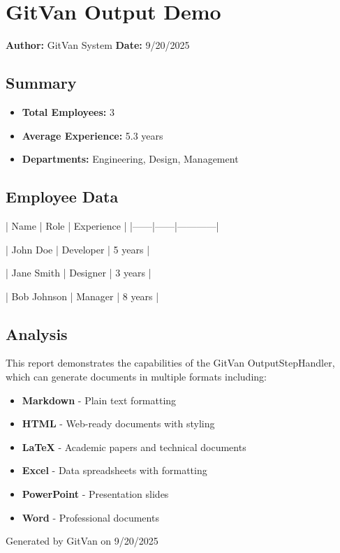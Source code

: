 \documentclass[11pt]{article}
\begin{document}
\section{GitVan Output Demo}

\textbf{Author:} GitVan System  
\textbf{Date:} 9/20/2025

\subsection{Summary}

\begin{itemize}
\item \textbf{Total Employees:} 3
\item \textbf{Average Experience:} 5.3 years
\item \textbf{Departments:} Engineering, Design, Management
\end{itemize}

\subsection{Employee Data}

| Name | Role | Experience |
|------|------|------------|

| John Doe | Developer | 5 years |

| Jane Smith | Designer | 3 years |

| Bob Johnson | Manager | 8 years |


\subsection{Analysis}

This report demonstrates the capabilities of the GitVan OutputStepHandler, which can generate documents in multiple formats including:

\begin{itemize}
\item \textbf{Markdown} - Plain text formatting
\item \textbf{HTML} - Web-ready documents with styling
\item \textbf{LaTeX} - Academic papers and technical documents
\item \textbf{Excel} - Data spreadsheets with formatting
\item \textbf{PowerPoint} - Presentation slides
\item \textbf{Word} - Professional documents
\end{itemize}

Generated by GitVan on 9/20/2025
\end{document}
